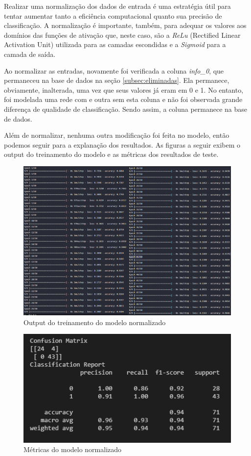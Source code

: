 \documentclass[12pt]{article}
\begin{document}
Realizar uma normalização dos dados de entrada é uma estratégia útil para tentar aumentar tanto a eficiência computacional quanto sua precisão de classificação. A normalização é importante, também, para adequar os valores aos domínios das funções de ativação que, neste caso, são a \textit{ReLu} (Rectified Linear Activation Unit) utilizada para as camadas escondidas e a \textit{Sigmoid} para a camada de saída.

Ao normalizar as entradas, novamente foi verificada a coluna \textit{info\_0}, que permaneceu na base de dados na seção \ref{subsec:eliminadas}. Ela permanece, obviamente, inalterada, uma vez que seus valores já eram em 0 e 1. No entanto, foi modelada uma rede com e outra sem esta coluna e não foi observada grande diferença de qualidade de classificação. Sendo assim, a coluna permanece na base de dados.

Além de normalizar, nenhuma outra modificação foi feita no modelo, então podemos seguir para a explanação dos resultados. As figuras a seguir exibem o output do treinamento do modelo e as métricas dos resultados de teste.

\begin{figure}[H]
	\centering
	\includegraphics[width=1.1\linewidth]{Imagens/Fit_Normalizada}
	\caption{Output do treinamento do modelo normalizado}
	\label{fig:fitnormalizada}
\end{figure}
\begin{figure}[H]
	\centering
	\includegraphics[width=0.7\linewidth]{Imagens/resultadoNormalizada}
	\caption{Métricas do modelo normalizado}
	\label{fig:resultadonormalizada}
\end{figure}
\end{document}
